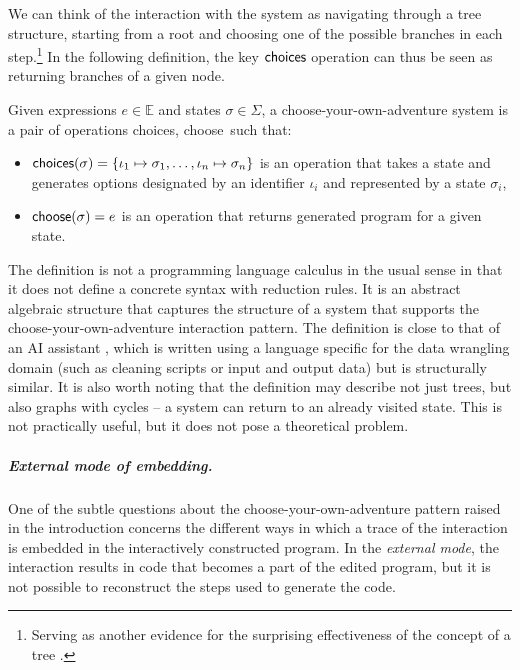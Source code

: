 \documentclass[a4paper,UKenglish,cleveref, autoref, thm-restate]{lipics-v2021}
\newcommand{\ident}[1]{\textsf{#1}}
\newcommand{\select}{\textnormal{\ident{choose}}}
\newcommand{\choices}{\textnormal{\ident{choices}}}
\begin{document}
We can think of the interaction with the system as navigating through a tree structure, starting
from a root and choosing one of the possible branches in each step.\footnote{Serving as another
evidence for the surprising effectiveness of the concept of a tree \cite{nesetril-2005-strom}.}
In the following definition, the key $\choices$ operation can thus be seen as returning
branches of a given node.

\begin{definition}\label{def:calculus}
Given expressions $e\in \mathbb{E}$ and states $\sigma \in \Sigma$, a choose-your-own-adventure
system is a pair of operations \choices, \select\ such that:

\vspace{-0.5em}
\raggedright
\begin{itemize}
  \item $\choices(\sigma) = \{\iota_1\mapsto\sigma_1, \ldots, \iota_n\mapsto\sigma_n\}$ is
    an operation that takes a state and \\ generates options designated by an identifier $\iota_i$
    and represented by a state $\sigma_i$,
  \item $\select(\sigma) = e$ is an operation that returns generated program for a given state.
\end{itemize}
\end{definition}

The definition is not a programming language calculus in the usual sense in that it does not
define a concrete syntax with reduction rules. It is an abstract algebraic structure that captures
the structure of a system that supports the choose-your-own-adventure interaction pattern.
The definition is close to that of an AI assistant \cite{petricek-2023-aias}, which is written
using a language specific for the data wrangling domain (such as cleaning scripts or input and
output data) but is structurally similar. It is also worth noting that the definition may describe
not just trees, but also graphs with cycles -- a system can return to an already visited state.
This is not practically useful, but it does not pose a theoretical problem.

\subparagraph{External mode of embedding.}
One of the subtle questions about the choose-your-own-adventure pattern raised in the introduction
concerns the different ways in which a trace of the interaction is embedded in the interactively
constructed program. In the \emph{external mode}, the interaction results in code that becomes a
part of the edited program, but it is not possible to reconstruct the steps used to generate the code.
\end{document}

